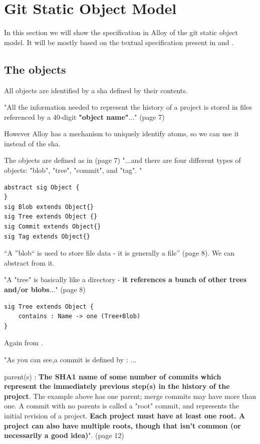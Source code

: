 \section{Git Static Object Model}

In this section we will show the specification in Alloy of the
git static object model. It will be mostly based on the textual
specification present in \cite{gitComm} and \cite{progit}.

\subsection{The objects}

All objects are identified by a sha defined by their contents. \par
"All the information needed to represent the history
of a project is stored in files referenced by a 
40-digit {\bf "object name"}..." (page 7) \par

However Alloy has a mechanism to uniquely identify atoms, so 
we can use it instead of the sha. \par

The objects are defined as in \cite{gitComm} (page 7) 
"...and there are four different types of objects: "blob",
"tree", "commit", and "tag". "

\begin{lstlisting}
abstract sig Object {
}
sig Blob extends Object{}
sig Tree extends Object {}
sig Commit extends Object{}
sig Tag extends Object{}
\end{lstlisting}

``A ''blob`` is used to store file data - it is generally a file'' 
\cite{gitComm} (page 8). We can abstract from it.

"A "tree" is basically like a directory - {\bf it references a bunch
of other trees and/or blobs}..." (page 8)

\begin{lstlisting}
sig Tree extends Object {
	contains : Name -> one (Tree+Blob)
}
\end{lstlisting}

Again from \cite{gitComm}. \par 
"As you can see,a commit is defined by :
... \par
parent(s) : {\bf The SHA1 name of some number of commits which
represent the immediately previous step(s) in the 
history of the project}. The example above has one parent;
merge commits may have more than one. A commit with no 
parents is called a "root" commit, and represents the 
initial revision of a project. {\bf Each project must have at
least one root. A project can also have multiple roots,
though that isn't common (or necessarily a good idea)}". (page 12)

